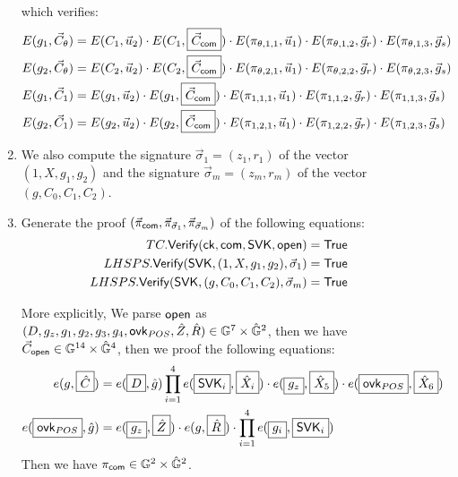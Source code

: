\begin{description}
\begin{enumerate}
    which verifies:
    \begin{align*}
      E(g_1, \vec{C}_{\theta}) &= E(C_1, \vec{u}_2) \cdot E(C_1, \boxed{\vec{C}_{\mathsf{com}}}) \cdot E(\pi_{\theta,1,1}, \vec{u}_1) \cdot E(\pi_{\theta,1,2}, \vec{g}_r) \cdot E(\pi_{\theta,1,3}, \vec{g}_s)\\
      E(g_2, \vec{C}_{\theta}) &= E(C_2, \vec{u}_2) \cdot E(C_2, \boxed{\vec{C}_{\mathsf{com}}}) \cdot E(\pi_{\theta,2,1}, \vec{u}_1) \cdot E(\pi_{\theta,2,2}, \vec{g}_r) \cdot E(\pi_{\theta,2,3}, \vec{g}_s)\\
      E(g_1, \vec{C}_{1}) &= E(g_1, \vec{u}_2) \cdot E(g_1, \boxed{\vec{C}_{\mathsf{com}}}) \cdot E(\pi_{1,1,1}, \vec{u}_1) \cdot E(\pi_{1,1,2}, \vec{g}_r) \cdot E(\pi_{1,1,3}, \vec{g}_s)\\
      E(g_2, \vec{C}_{1}) &= E(g_2, \vec{u}_2) \cdot E(g_2, \boxed{\vec{C}_{\mathsf{com}}}) \cdot E(\pi_{1,2,1}, \vec{u}_1) \cdot E(\pi_{1,2,2}, \vec{g}_r) \cdot E(\pi_{1,2,3}, \vec{g}_s)
    \end{align*}
  \item We also compute the signature $\vec{\sigma}_1 = (z_1, r_1)$ of the vector $(1, X, g_1, g_2)$ and the signature $\vec{\sigma}_m = (z_m, r_m)$ of the vector $(g, C_0, C_1, C_2)$.
  \item Generate the proof $(\vec{\pi}_{\mathsf{com}}, \vec{\pi}_{\vec{\sigma}_1}, \vec{\pi}_{\vec{\sigma}_m})$ of the following equations:
    \begin{align*}
      TC.{\mathsf{Verify}}(\mathsf{ck}, \mathsf{com}, \mathsf{SVK}, \mathsf{open}) &= \mathsf{True}\\
      LHSPS.{\mathsf{Verify}}(\mathsf{SVK}, (1, X, g_1, g_2), \vec{\sigma}_1) &= \mathsf{True}\\
      LHSPS.{\mathsf{Verify}}(\mathsf{SVK}, (g, C_0, C_1, C_2), \vec{\sigma}_m) &= \mathsf{True}\\
    \end{align*}
    
    More explicitly, We parse $\mathsf{open}$ as $(D, g_z, g_1, g_2, g_3, g_4, \mathsf{ovk}_{POS}, \hat{Z}, \hat{R}) \in \mathbb{G}^7 \times \hat{\mathbb{G}}^2$, then we have $\vec{C}_{\mathsf{open}} \in \mathbb{G}^{14} \times \hat{\mathbb{G}}^4$, then we proof the following equations:
    \begin{align*}
      e(g, \boxed{\hat{C}}) &= e(\boxed{D}, \hat{g}) \prod_{i = 1}^{4} e(\boxed{\mathsf{SVK}_i}, \boxed{\hat{X}_i}) \cdot e(\boxed{g_z}, \boxed{\hat{X}_5}) \cdot e(\boxed{\mathsf{ovk}_{POS}}, \boxed{\hat{X}_6}) \\
      e(\boxed{\mathsf{ovk}_{POS}}, \hat{g}) &= e(\boxed{g_z}, \boxed{\hat{Z}}) \cdot e(g, \boxed{\hat{R}}) \cdot \prod_{i = 1}^4 e(\boxed{g_i}, \boxed{\mathsf{SVK}_i}) 
    \end{align*}
    Then we have $\pi_{\mathsf{com}} \in \mathbb{G}^2 \times \hat{\mathbb{G}}^2$.


\end{enumerate}
\end{description}
